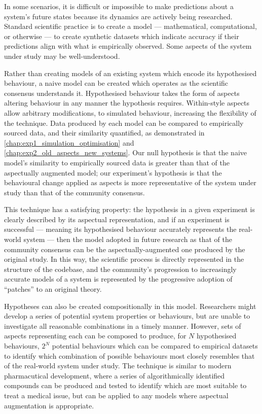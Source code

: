 In some scenarios, it is difficult or impossible to make predictions about a
system's future states because its dynamics are actively being researched.
Standard scientific practice is to create a model --- mathematical,
computational, or otherwise --- to create synthetic datasets which indicate
accuracy if their predictions align with what is empirically observed.
 Some aspects of the system under study may be
well-understood.

Rather than creating models of an existing system which encode its hypothesised
behaviour, a naive model can be created which operates as the scientific
consensus understands it. Hypothesised behaviour takes the form of aspects
altering behaviour in any manner the hypothesis requires. Within-style aspects
allow arbitrary modifications, to simulated behaviour, increasing the
flexibility of the technique. Data produced by each model can be compared to
empirically sourced data, and their similarity quantified, as demonstrated in
\cref{chap:exp1_simulation_optimisation} and
\cref{chap:exp2_old_aspects_new_systems}. Our null hypothesis is that the naive
model's similarity to empirically sourced data is greater than that of the
aspectually augmented model; our experiment's hypothesis is that the behavioural
change applied as aspects is more representative of the system under study than
that of the community consensus.

This technique has a satisfying property: the hypothesis in a given experiment is
clearly described by its aspectual representation, and if an experiment is
successful --- meaning its hypothesised behaviour accurately represents the
real-world system --- then the model adopted in future research as that of the
community consensus can be the aspectually-augmented one produced by the
original study. In this way, the scientific process is directly represented in
the structure of the codebase, and the community's progression to increasingly
accurate models of a system is represented by the progressive adoption of
``patches'' to an original theory.

Hypotheses can also be created compositionally in this model. Researchers might
develop a series of potential system properties or behaviours, but are unable to
investigate all reasonable combinations in a timely manner. However, sets of
aspects representing each can be composed to produce, for $N$ hypothesised
behaviours, $2^N$ potential behaviours which can be compared to empirical
datasets to identify which combination of possible behaviours most closely
resembles that of the real-world system under study. The technique is similar to
modern pharmacutical development, where a series of algorithmically identified
compounds can be produced and tested to identify which are most suitable to
treat a medical issue, but can be applied to any models where aspectual augmentation
is appropriate.

